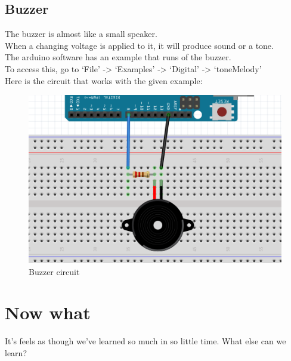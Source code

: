 \documentclass[14pt]{memoir}
\begin{document}
\section*{Buzzer}
The buzzer is almost like a small speaker.
\\
When a changing voltage is applied to it, it will produce sound or
a tone.
\\
The arduino software has an example that runs of the buzzer.
\\
To access this, go to `File' -> `Examples' -> `Digital' ->
`toneMelody'
\\
Here is the circuit that works with the given example:
\begin{figure}[h]
    \includegraphics[width=\linewidth]{circuit_images/buzzer.png}
    \caption{Buzzer circuit}
\end{figure}

\chapter{Now what}
It's feels as though we've learned so much in so little time. What
else can we learn?
\end{document}
